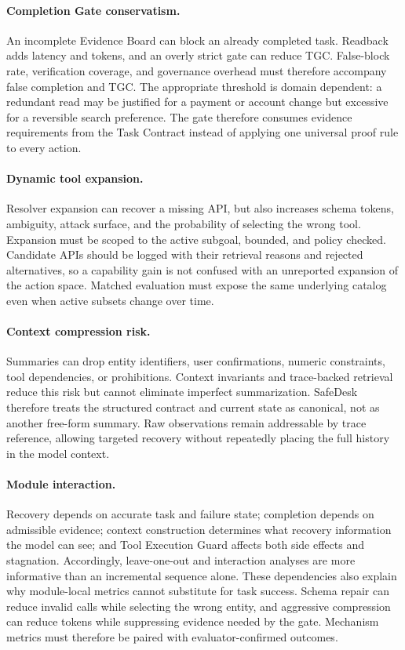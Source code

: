 \documentclass[10pt]{article}
\begin{document}
\paragraph{Completion Gate conservatism.}
An incomplete Evidence Board can block an already completed task. Readback adds
latency and tokens, and an overly strict gate can reduce TGC. False-block rate,
verification coverage, and governance overhead must therefore accompany false
completion and TGC.
The appropriate threshold is domain dependent: a redundant read may be justified
for a payment or account change but excessive for a reversible search preference.
The gate therefore consumes evidence requirements from the Task Contract instead
of applying one universal proof rule to every action.

\paragraph{Dynamic tool expansion.}
Resolver expansion can recover a missing API, but also increases schema tokens,
ambiguity, attack surface, and the probability of selecting the wrong tool.
Expansion must be scoped to the active subgoal, bounded, and policy checked.
Candidate APIs should be logged with their retrieval reasons and rejected
alternatives, so a capability gain is not confused with an unreported expansion
of the action space. Matched evaluation must expose the same underlying catalog
even when active subsets change over time.

\paragraph{Context compression risk.}
Summaries can drop entity identifiers, user confirmations, numeric constraints,
tool dependencies, or prohibitions. Context invariants and trace-backed retrieval
reduce this risk but cannot eliminate imperfect summarization.
SafeDesk therefore treats the structured contract and current state as canonical,
not as another free-form summary. Raw observations remain addressable by trace
reference, allowing targeted recovery without repeatedly placing the full history
in the model context.

\paragraph{Module interaction.}
Recovery depends on accurate task and failure state; completion depends on
admissible evidence; context construction determines what recovery information the
model can see; and Tool Execution Guard affects both side effects and stagnation.
Accordingly, leave-one-out and interaction analyses are more informative than an
incremental sequence alone.
These dependencies also explain why module-local metrics cannot substitute for
task success. Schema repair can reduce invalid calls while selecting the wrong
entity, and aggressive compression can reduce tokens while suppressing evidence
needed by the gate. Mechanism metrics must therefore be paired with
evaluator-confirmed outcomes.
\end{document}
